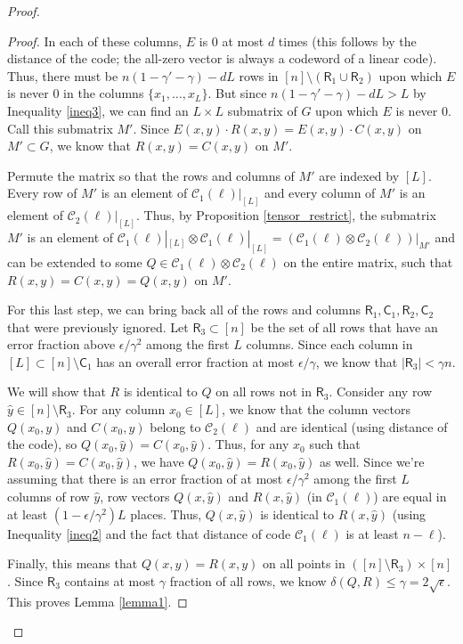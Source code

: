 \documentclass[11pt]{article}
\newcommand{\C}{\mathcal{C}}
\newcommand{\Row}{\mathsf{R}}
\newcommand{\Col}{\mathsf{C}}
\renewcommand{\d}{d}
\begin{document}
\begin{proof}
\begin{proof}
In each of these columns, $E$ is $0$ at most $\d$ times (this follows by the distance of the code; the all-zero vector is always a codeword of a linear code). Thus, there must be $n(1 - \gamma' - \gamma) - dL$ rows in $[n] \setminus (\Row_1 \cup \Row_2)$ upon which $E$ is never $0$ in the columns $\{x_1, \dots, x_L\}$. But since $n(1-\gamma' - \gamma) - dL > L$ by Inequality \eqref{ineq3}, we can find an $L \times L$ submatrix of $G$ upon which $E$ is never $0$. Call this submatrix $M'$. Since $E(x,y) \cdot R(x,y) = E(x,y) \cdot C(x,y)$ on $ M'\subset G$, we know that $R(x,y) = C(x,y)$ on $M'$.

Permute the matrix so that the rows and columns of $M'$ are indexed by $[L]$. Every row of $M'$ is an element of $\C_1(\ell)|_{[L]}$ and every column of $M'$ is an element of $\C_2(\ell)|_{[L]}$. Thus, by Proposition \ref{tensor_restrict}, the submatrix $M'$ is an element of $\C_1(\ell)|_{[L]} \otimes \C_1(\ell)|_{[L]} = (\C_1(\ell) \otimes \C_2(\ell))|_{M'}$ and can be extended to some $Q \in \C_1(\ell) \otimes \C_2(\ell)$ on the entire matrix, such that $R(x, y) = C(x, y) = Q(x, y)$ on $M'$. 

For this last step, we can bring back all of the rows and columns $\Row_1, \Col_1, \Row_2, \Col_2$ that were previously ignored. Let $\Row_3 \subset [n]$ be the set of all rows that have an error fraction above $\epsilon/\gamma^2$ among the first $L$ columns. Since each column in $[L] \subset [n] \setminus \Col_1$ has an overall error fraction at most $\epsilon/\gamma$, we know that $|\Row_3| < \gamma n$.

We will show that $R$ is identical to $Q$ on all rows not in $\Row_3$. Consider any row $\hat y \in [n] \setminus \Row_3$. For any column $x_0 \in [L]$, we know that the column vectors $Q(x_0, y)$ and $C(x_0, y)$ belong to $\C_2(\ell)$ and are identical (using distance of the code), so $Q(x_0, \hat y) = C(x_0, \hat y)$. Thus, for any $x_0$ such that $R(x_0, \hat y) = C(x_0, \hat y)$, we have $Q(x_0, \hat y) = R(x_0, \hat y)$ as well. Since we're assuming that there is an error fraction of at most $\epsilon/\gamma^2$ among the first $L$ columns of row $\hat y$,  row vectors $Q(x, \hat y)$ and $R(x, \hat y)$ (in $\C_1(\ell)$) are equal in at least $(1-\epsilon/\gamma^2)L$ places. Thus, $Q(x, \hat y)$ is identical to $R(x, \hat y)$ (using Inequality \eqref{ineq2} and the fact that distance of code $\C_1(\ell)$ is at least $n-\ell$).

Finally, this means that $Q(x,y) = R(x,y)$ on all points in $([n] \setminus \Row_3) \times [n]$. Since $\Row_3$ contains at most $\gamma$ fraction of all rows, we know $\delta(Q, R) \leq \gamma = 2\sqrt{\epsilon}$. This proves Lemma \ref{lemma1}.
\end{proof}


\end{proof}
\end{document}
